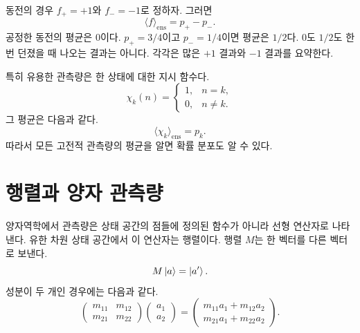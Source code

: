 동전의 경우 \(f_+=+1\)와 \(f_-=-1\)로 정하자. 그러면
\begin{equation}
  \langle f\rangle_{\mathrm{ens}}
  =p_+-p_-.
  \label{eq:l02-coin-expectation}
\end{equation}
공정한 동전의 평균은 0이다. \(p_+=3/4\)이고 \(p_-=1/4\)이면 평균은 \(1/2\)다. \(0\)도 \(1/2\)도 한 번 던졌을 때 나오는 결과는 아니다. 각각은 많은 \(+1\) 결과와 \(-1\) 결과를 요약한다.

\begin{classroomqa}
\end{classroomqa}

특히 유용한 관측량은 한 상태에 대한 지시 함수다.
\begin{equation}
  \chi_k(n)=
  \begin{cases}
    1,&n=k,\\
    0,&n\ne k.
  \end{cases}
\end{equation}
그 평균은 다음과 같다.
\begin{equation}
  \langle\chi_k\rangle_{\mathrm{ens}}=p_k.
\end{equation}
따라서 모든 고전적 관측량의 평균을 알면 확률 분포도 알 수 있다.

\section{행렬과 양자 관측량}

양자역학에서 관측량은 상태 공간의 점들에 정의된 함수가 아니라 선형 연산자로 나타낸다. 유한 차원 상태 공간에서 이 연산자는 행렬이다. 행렬 \(M\)는 한 벡터를 다른 벡터로 보낸다.
\begin{equation}
  M\left\lvert a\right\rangle=\left\lvert a'\right\rangle.
  \label{eq:l02-matrix-action}
\end{equation}
성분이 두 개인 경우에는 다음과 같다.
\begin{equation}
  \begin{pmatrix}
    m_{11}&m_{12}\\
    m_{21}&m_{22}
  \end{pmatrix}
  \begin{pmatrix}a_1\\a_2\end{pmatrix}
  =
  \begin{pmatrix}
    m_{11}a_1+m_{12}a_2\\
    m_{21}a_1+m_{22}a_2
  \end{pmatrix}.
  \label{eq:l02-matrix-components}
\end{equation}

